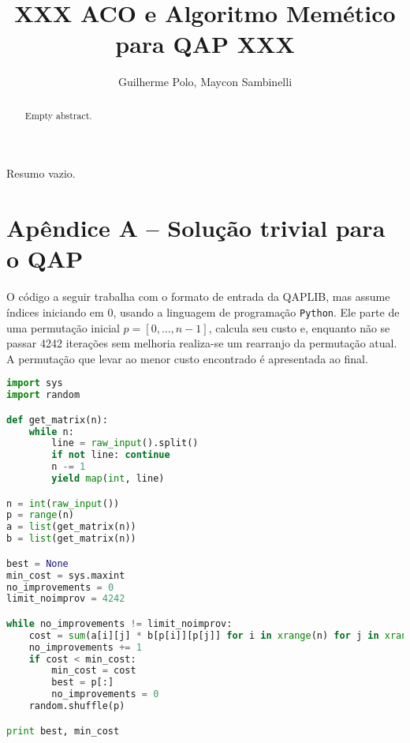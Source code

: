 \documentclass[a4paper, 12pt]{article}
\title{XXX ACO e Algoritmo Memético para QAP XXX}
\author{Guilherme Polo\inst{1}, Maycon Sambinelli\inst{1} }
\begin{document}
\maketitle

\begin{abstract}
Empty abstract.
\end{abstract}

\begin{resumo}
Resumo vazio.
\end{resumo}






\section*{Apêndice A -- Solução trivial para o QAP}
\label{apendiceA}

O código a seguir trabalha com o formato de entrada da QAPLIB, mas
assume índices iniciando em 0, usando a linguagem de programação
\texttt{Python}. Ele parte de uma permutação inicial $p = [0, \ldots,
n - 1]$, calcula seu custo e, enquanto não se passar 4242 iterações
sem melhoria realiza-se um rearranjo da permutação atual. A permutação
que levar ao menor custo encontrado é apresentada ao final.

\begin{lstlisting}[language=Python,basicstyle=\footnotesize]
import sys
import random

def get_matrix(n):
    while n:
        line = raw_input().split()
        if not line: continue
        n -= 1
        yield map(int, line)

n = int(raw_input())
p = range(n)
a = list(get_matrix(n))
b = list(get_matrix(n))

best = None
min_cost = sys.maxint
no_improvements = 0
limit_noimprov = 4242

while no_improvements != limit_noimprov:
    cost = sum(a[i][j] * b[p[i]][p[j]] for i in xrange(n) for j in xrange(n))
    no_improvements += 1
    if cost < min_cost:
        min_cost = cost
        best = p[:]
        no_improvements = 0
    random.shuffle(p)

print best, min_cost
\end{lstlisting}
\end{document}
